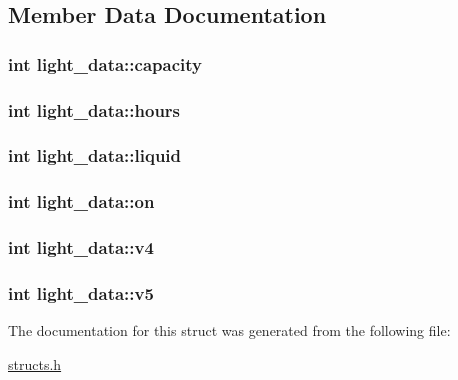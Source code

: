 \subsection{Member Data Documentation}
\hypertarget{structlight__data_a8bc24a597cb860b3a0891a8f0f6e6bd9}{
\subsubsection[{capacity}]{\setlength{\rightskip}{0pt plus 5cm}int light\-\_\-data\-::capacity}}\label{structlight__data_a8bc24a597cb860b3a0891a8f0f6e6bd9}
\hypertarget{structlight__data_a8679878a7afcc7278d2bf0a0d7b5e35d}{
\subsubsection[{hours}]{\setlength{\rightskip}{0pt plus 5cm}int light\-\_\-data\-::hours}}\label{structlight__data_a8679878a7afcc7278d2bf0a0d7b5e35d}
\hypertarget{structlight__data_a789bceba8c793e1f731b12fb420c473c}{
\subsubsection[{liquid}]{\setlength{\rightskip}{0pt plus 5cm}int light\-\_\-data\-::liquid}}\label{structlight__data_a789bceba8c793e1f731b12fb420c473c}
\hypertarget{structlight__data_a3936b36b705f11be6ac709b90b720e58}{
\subsubsection[{on}]{\setlength{\rightskip}{0pt plus 5cm}int light\-\_\-data\-::on}}\label{structlight__data_a3936b36b705f11be6ac709b90b720e58}
\hypertarget{structlight__data_ab48231ec90350c1e7156e54a121be518}{
\subsubsection[{v4}]{\setlength{\rightskip}{0pt plus 5cm}int light\-\_\-data\-::v4}}\label{structlight__data_ab48231ec90350c1e7156e54a121be518}
\hypertarget{structlight__data_a3deebe2d242690fa0e5963ba96236475}{
\subsubsection[{v5}]{\setlength{\rightskip}{0pt plus 5cm}int light\-\_\-data\-::v5}}\label{structlight__data_a3deebe2d242690fa0e5963ba96236475}


The documentation for this struct was generated from the following file\-:\begin{DoxyCompactItemize}
\item 
\hyperlink{structs_8h}{structs.\-h}\end{DoxyCompactItemize}
